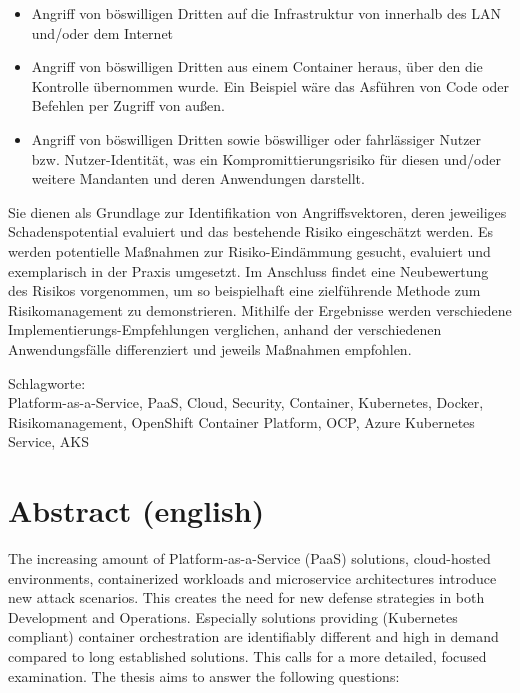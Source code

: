 \begin{itemize}

\item Angriff von böswilligen Dritten auf die Infrastruktur von innerhalb des LAN und/oder dem Internet

\item Angriff von böswilligen Dritten aus einem Container heraus, über den die Kontrolle übernommen wurde. Ein Beispiel wäre das Asführen von Code oder Befehlen per Zugriff von außen.

\item Angriff von böswilligen Dritten sowie böswilliger oder fahrlässiger Nutzer bzw. Nutzer-Identität, was ein Kompromittierungsrisiko für diesen und/oder weitere Mandanten und deren Anwendungen darstellt.

\end{itemize}

Sie dienen als Grundlage zur Identifikation von Angriffsvektoren, deren jeweiliges Schadenspotential evaluiert und das bestehende Risiko eingeschätzt werden.
Es werden potentielle Maßnahmen zur Risiko-Eindämmung gesucht, evaluiert und exemplarisch in der Praxis umgesetzt.
Im Anschluss findet eine Neubewertung des Risikos vorgenommen, um so beispielhaft eine zielführende Methode zum Risikomanagement zu demonstrieren.
Mithilfe der Ergebnisse werden verschiedene Implementierungs-Empfehlungen verglichen, anhand der verschiedenen Anwendungsfälle differenziert und jeweils Maßnahmen empfohlen.

\bigskip

\noindent
Schlagworte: \\
Platform-as-a-Service, PaaS, Cloud, Security, Container, Kubernetes, Docker, Risikomanagement, OpenShift Container Platform, OCP, Azure Kubernetes Service, AKS

\chapter*{Abstract (english)}
\thispagestyle{empty}

The increasing amount of Platform-as-a-Service (PaaS) solutions, cloud-hosted environments, containerized workloads and microservice architectures introduce new attack scenarios. 
This creates the need for new defense strategies in both Development and Operations. 
Especially solutions providing (Kubernetes compliant) container orchestration are identifiably different and high in demand compared to long established solutions. 
This calls for a more detailed, focused examination. 
The thesis aims to answer the following questions:

